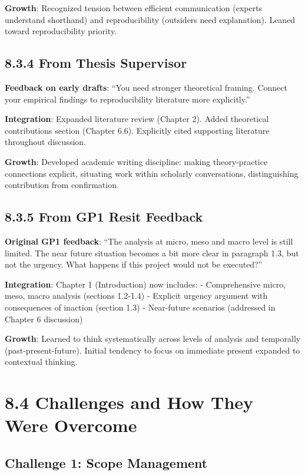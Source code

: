 \documentclass[
  oneside,
  open=any]{scrbook}
\begin{document}
\textbf{Growth}: Recognized tension between efficient communication
(experts understand shorthand) and reproducibility (outsiders need
explanation). Leaned toward reproducibility priority.

\subsection{8.3.4 From Thesis Supervisor}\label{from-thesis-supervisor}

\textbf{Feedback on early drafts}: ``You need stronger theoretical
framing. Connect your empirical findings to reproducibility literature
more explicitly.''

\textbf{Integration}: Expanded literature review (Chapter 2). Added
theoretical contributions section (Chapter 6.6). Explicitly cited
supporting literature throughout discussion.

\textbf{Growth}: Developed academic writing discipline: making
theory-practice connections explicit, situating work within scholarly
conversations, distinguishing contribution from confirmation.

\subsection{8.3.5 From GP1 Resit
Feedback}\label{from-gp1-resit-feedback}

\textbf{Original GP1 feedback}: ``The analysis at micro, meso and macro
level is still limited. The near future situation becomes a bit more
clear in paragraph 1.3, but not the urgency. What happens if this
project would not be executed?''

\textbf{Integration}: Chapter 1 (Introduction) now includes: -
Comprehensive micro, meso, macro analysis (sections 1.2-1.4) - Explicit
urgency argument with consequences of inaction (section 1.3) -
Near-future scenarios (addressed in Chapter 6 discussion)

\textbf{Growth}: Learned to think systematically across levels of
analysis and temporally (past-present-future). Initial tendency to focus
on immediate present expanded to contextual thinking.

\section{8.4 Challenges and How They Were
Overcome}\label{challenges-and-how-they-were-overcome}

\subsection{Challenge 1: Scope
Management}\label{challenge-1-scope-management}
\end{document}
